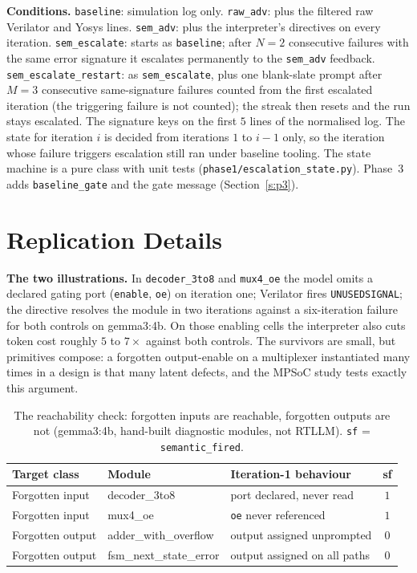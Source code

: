 \documentclass[11pt]{article}
\newcommand{\cond}[1]{\texttt{#1}}
\begin{document}
\textbf{Conditions.} \cond{baseline}: simulation log only. \cond{raw\_adv}:
plus the filtered raw Verilator and Yosys lines. \cond{sem\_adv}: plus the
interpreter's directives on every iteration. \cond{sem\_escalate}: starts as
\cond{baseline}; after $N{=}2$ consecutive failures with the same error
signature it escalates permanently to the \cond{sem\_adv} feedback.
\cond{sem\_escalate\_restart}: as \cond{sem\_escalate}, plus one blank-slate
prompt after $M{=}3$ consecutive same-signature failures counted from the first
escalated iteration (the triggering failure is not counted); the streak then
resets and the run stays escalated. The signature keys on the first $5$ lines of
the normalised log. The state for iteration $i$ is decided from iterations
$1$ to $i{-}1$ only, so the iteration whose failure triggers escalation still
ran under baseline tooling. The state machine is a pure class with unit tests
(\texttt{phase1/escalation\_state.py}). Phase~3 adds \cond{baseline\_gate}
and the gate message (Section~\ref{s:p3}).

\section{Replication Details}
\label{s:replication}

\textbf{The two illustrations.} In \texttt{decoder\_3to8} and \texttt{mux4\_oe}
the model omits a declared gating port (\texttt{enable}, \texttt{oe}) on
iteration one; Verilator fires \cond{UNUSEDSIGNAL}; the directive resolves the
module in two iterations against a six-iteration failure for both controls on
gemma3:4b. On those enabling cells the interpreter also cuts token cost roughly
$5$ to $7\times$ against both controls. The survivors are small, but primitives
compose: a forgotten output-enable on a multiplexer instantiated many times in
a design is that many latent defects, and the MPSoC study tests exactly this
argument.

\begin{table}[htbp]
\centering
\caption{The reachability check: forgotten inputs are reachable, forgotten
outputs are not (gemma3:4b, hand-built diagnostic modules, not RTLLM).
\texttt{sf} = \cond{semantic\_fired}.}
\label{tab:s-asym}
\small
\begin{tabular}{@{}l l l c@{}}
\toprule
\textbf{Target class} & \textbf{Module} & \textbf{Iteration-1 behaviour} & \textbf{sf} \\
\midrule
Forgotten input  & decoder\_3to8 & port declared, never read & $1$ \\
Forgotten input  & mux4\_oe      & \texttt{oe} never referenced & $1$ \\
Forgotten output & adder\_with\_overflow & output assigned unprompted & $0$ \\
Forgotten output & fsm\_next\_state\_error & output assigned on all paths & $0$ \\
\bottomrule
\end{tabular}
\end{table}
\end{document}
